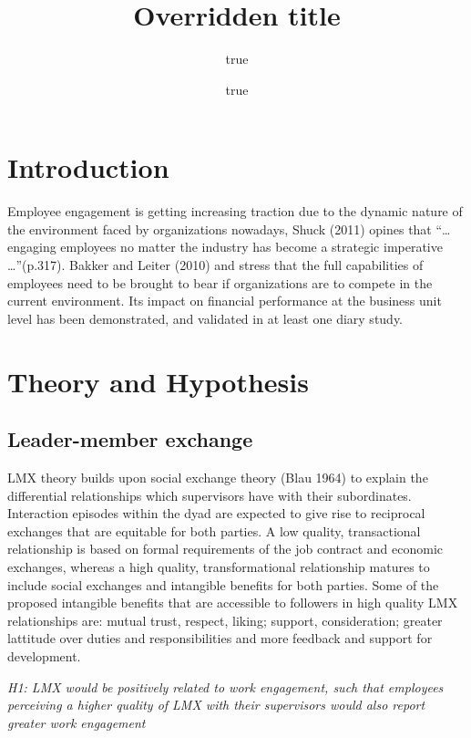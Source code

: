 \documentclass[12pt,a4paper,]{article}
\title{Overridden title}
\author{true \and true}
\date{}
\begin{document}
\maketitle

\section{Introduction}\label{introduction}

Employee engagement is getting increasing traction due to the dynamic
nature of the environment faced by organizations nowadays, Shuck (2011)
opines that ``\ldots{} engaging employees no matter the industry has
become a strategic imperative \ldots{}''(p.317). Bakker and Leiter
(2010) and stress that the full capabilities of employees need to be
brought to bear if organizations are to compete in the current
environment. Its impact on financial performance at the business unit
level has been demonstrated, and validated in at least one diary study.

\section{Theory and Hypothesis}\label{theory-and-hypothesis}

\subsection{Leader-member exchange}\label{leader-member-exchange}

LMX theory builds upon social exchange theory (Blau 1964) to explain the
differential relationships which supervisors have with their
subordinates. Interaction episodes within the dyad are expected to give
rise to reciprocal exchanges that are equitable for both parties. A low
quality, transactional relationship is based on formal requirements of
the job contract and economic exchanges, whereas a high quality,
transformational relationship matures to include social exchanges and
intangible benefits for both parties. Some of the proposed intangible
benefits that are accessible to followers in high quality LMX
relationships are: mutual trust, respect, liking; support,
consideration; greater lattitude over duties and responsibilities and
more feedback and support for development.

\emph{H1: LMX would be positively related to work engagement, such that
employees perceiving a higher quality of LMX with their supervisors
would also report greater work engagement}
\end{document}
